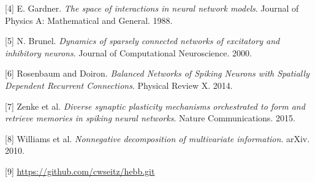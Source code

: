 \documentclass{article} %
\begin{document}
[4] E. Gardner. \textit{The space of interactions in neural network models}. Journal of Physics A: Mathematical and General. 1988.

[5] N. Brunel. \textit{Dynamics of sparsely connected networks of excitatory and inhibitory neurons}. Journal of Computational Neuroscience. 2000. 

[6] Rosenbaum and Doiron. \textit{Balanced Networks of Spiking Neurons with Spatially Dependent Recurrent Connections}. Physical Review X. 2014.

[7] Zenke et al. \textit{Diverse synaptic plasticity mechanisms
orchestrated to form and retrieve memories
in spiking neural networks}. Nature Communications. 2015.

[8] Williams et al. \textit{Nonnegative decomposition of multivariate information}. arXiv. 2010.

[9] \url{https://github.com/cwseitz/hebb.git}
\end{document}
